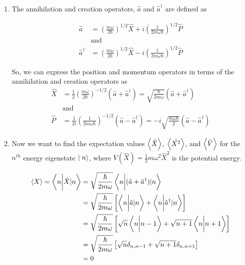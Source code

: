 \documentclass[twoside]{article}
\begin{document}
\begin{enumerate}
   \item The annihilation and creation operators, $\hat{a}$ and $\hat{a}^{\dagger}$ are defined as 
   
   \begin{align*}
      \hat{a} &= \left(\frac{m\omega}{2\hbar}\right)^{1/2} \hat{X} + i\left( \frac{1}{2m\omega\hbar} \right)^{1/2} \hat{P} \\
      &\text{and} \\
      \hat{a}^{\dagger} &= \left(\frac{m\omega}{2\hbar}\right)^{1/2} \hat{X} - i\left( \frac{1}{2m\omega\hbar} \right)^{1/2} \hat{P}
   \end{align*}

   So, we can express the position and momentum operators in terms of the annihilation and creation operators as 
   \begin{align*}
      \hat{X} &= \frac{1}{2} \left(\frac{m\omega}{2\hbar} \right)^{-1/2} \left( \hat{a} + \hat{a}^{\dagger} \right) = \sqrt{\frac{\hbar}{2 m \omega}} \left( \hat{a} + \hat{a}^{\dagger} \right) \\
      &\text{and} \\
      \hat{P} &= \frac{1}{2i} \left(\frac{1}{2m\omega\hbar} \right)^{-1/2} \left( \hat{a} - \hat{a}^{\dagger} \right) = -i \sqrt{\frac{m\omega\hbar}{2}} \left( \hat{a} - \hat{a}^{\dagger} \right)
   \end{align*}
   
   \item Now we want to find the expectation values $\left\langle \hat{X} \right\rangle$, $\left\langle \hat{X^2} \right\rangle$, and $\left\langle \hat{V} \right\rangle$ for the $n^{th}$ energy eigenstate $\mid n\rangle$, where $V(\hat{X}) = \frac{1}{2}m\omega^2 \hat{X}^2$ is the potential energy.
   
   \begin{align*}
      \left\langle X \right\rangle = \left\langle n \bigg\rvert \hat{X}|n \right\rangle &= \sqrt{\frac{\hbar}{2m\omega}} \left\langle n \bigg\rvert (\hat{a} + \hat{a}^{\dagger})|n \right\rangle \\
      &= \sqrt{\frac{\hbar}{2m\omega}} \left[ \left\langle n \bigg\rvert \hat{a}|n \right\rangle + \left\langle n \bigg\rvert \hat{a}^{\dagger}|n \right\rangle \right] \\
      &= \sqrt{\frac{\hbar}{2m\omega}} \left[ \sqrt{n}\left\langle n \bigg\rvert n-1 \right\rangle + \sqrt{n+1}\left\langle n \bigg\rvert n+1 \right\rangle \right] \\
      &= \sqrt{\frac{\hbar}{2m\omega}} \left[ \sqrt{n}\delta_{n, n-1} + \sqrt{n+1}\delta_{n, n+1} \right] \\
      &= 0
   \end{align*}


\end{enumerate}
\end{document}
